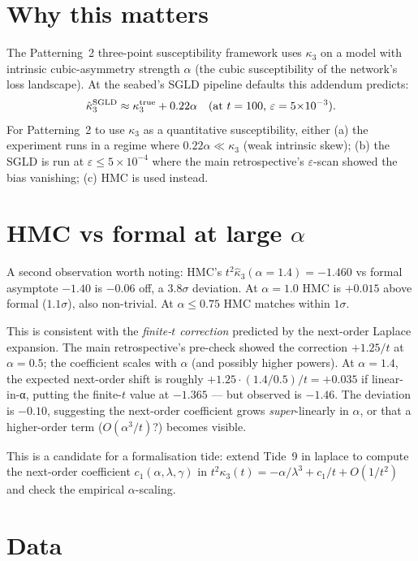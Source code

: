 \documentclass[11pt]{article}
\begin{document}
\section{Why this matters}

The Patterning~2 three-point susceptibility framework uses
$\kappa_3$ on a model with intrinsic cubic-asymmetry strength $\alpha$
(the cubic susceptibility of the network's loss landscape). At the
seabed's SGLD pipeline defaults this addendum predicts:
\[
  \hat\kappa_3^{\rm SGLD} \approx \kappa_3^{\rm true} + 0.22 \alpha
  \quad \text{(at $t = 100$, $\varepsilon = 5{\times}10^{-3}$).}
\]
For Patterning~2 to use $\kappa_3$ as a quantitative susceptibility,
either (a) the experiment runs in a regime where $0.22\alpha \ll \kappa_3$
(weak intrinsic skew); (b) the SGLD is run at $\varepsilon \leq 5{\times}10^{-4}$
where the main retrospective's $\varepsilon$-scan showed the bias
vanishing; (c) HMC is used instead.

\section{HMC vs formal at large $\alpha$}

A second observation worth noting: HMC's $t^2 \hat\kappa_3(\alpha = 1.4)
= -1.460$ vs formal asymptote $-1.40$ is $-0.06$ off, a $3.8\sigma$
deviation. At $\alpha = 1.0$ HMC is $+0.015$ above formal ($1.1\sigma$),
also non-trivial. At $\alpha \leq 0.75$ HMC matches within $1\sigma$.

This is consistent with the \emph{finite-$t$ correction} predicted by
the next-order Laplace expansion. The main retrospective's
pre-check showed the correction $+1.25/t$ at $\alpha = 0.5$; the
coefficient scales with $\alpha$ (and possibly higher powers). At
$\alpha = 1.4$, the expected next-order shift is roughly $+1.25 \cdot
(1.4/0.5) / t = +0.035$ if linear-in-α, putting the finite-$t$ value
at $-1.365$ --- but observed is $-1.46$. The deviation is $-0.10$,
suggesting the next-order coefficient grows \emph{super}-linearly in
$\alpha$, or that a higher-order term ($O(\alpha^3 / t)$?) becomes
visible.

This is a candidate for a formalisation tide: extend Tide~9 in
laplace to compute the next-order coefficient
$c_1(\alpha, \lambda, \gamma)$ in $t^2 \kappa_3(t) = -\alpha/\lambda^3
+ c_1 / t + O(1/t^2)$ and check the empirical $\alpha$-scaling.

\section{Data}
\end{document}
